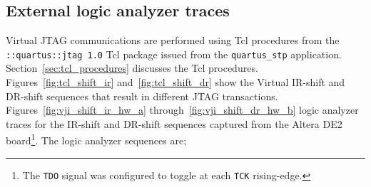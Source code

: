 \documentclass[10pt,twoside]{article}
\begin{document}
\clearpage
\subsection{External logic analyzer traces}
\label{sec:external_logic_analyzer_traces}

Virtual JTAG communications are performed using  Tcl
procedures from the \verb+::quartus::jtag 1.0+ Tcl package 
issued from the \verb+quartus_stp+ application. 
Section~\ref{sec:tcl_procedures} discusses the Tcl
procedures. 
Figures~\ref{fig:tcl_shift_ir} and~\ref{fig:tcl_shift_dr}
show the Virtual IR-shift and DR-shift sequences that result
in different JTAG transactions.
Figures~\ref{fig:vji_shift_ir_hw_a} through~\ref{fig:vji_shift_dr_hw_b} 
logic analyzer traces for the IR-shift and DR-shift sequences
captured from the Altera DE2 board\footnote{The {\tt TDO} signal
was configured to toggle at each {\tt TCK} rising-edge.}.
The logic analyzer sequences are;
%
\end{document}
